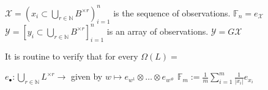 \documentclass[letterpaper,10pt]{article}
\begin{document}
$\mathcal{X} = (x_i \subset \bigcup_{r\in \mathbb{N}} B^{\times r } )_{i=1}^n$ is the sequence of observations.
$\mathbb{F}_n = e_{\mathcal{X}} $
$\mathcal{Y} = [y_i \subset \bigcup_{r\in \mathbb{N}} B^{\times r } ]_{i=1}^n$ is an array of observations.
$\mathcal{Y} = G\mathcal{X} $


It is routine to verify that for every 
$\Omega(L) = $

$e_{\bullet}: \bigcup_{r\in\mathbb{N}} L^{\times r } \rightarrow $ given by $w \mapsto e_{w^1}\otimes \dots\otimes e_{w^\#}$ 
$\mathbb{F}_m := \frac{1}{m}\sum_{i=1}^{m} \frac{1}{|x_i|}e_{x_i}$


\printbibliography
\end{document}
